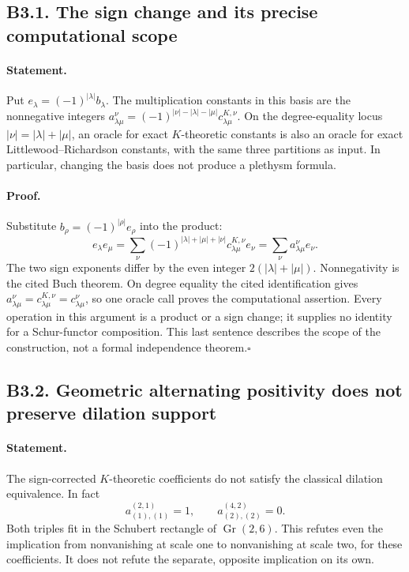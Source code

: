\subsection*{B3.1. The sign change and its precise computational scope}
\paragraph{Statement.}
Put $e_\lambda=(-1)^{|\lambda|}b_\lambda$.  The multiplication constants
in this basis are the nonnegative integers
$a_{\lambda\mu}^{\nu}=(-1)^{|\nu|-|\lambda|-|\mu|}
c^{K,\nu}_{\lambda\mu}$.  On the degree-equality locus
$|\nu|=|\lambda|+|\mu|$, an oracle for exact $K$-theoretic constants is
also an oracle for exact Littlewood--Richardson constants, with the same
three partitions as input.  In particular, changing the basis does not
produce a plethysm formula.
\paragraph{Proof.}
Substitute $b_\rho=(-1)^{|\rho|}e_\rho$ into the product:
\[
 e_\lambda e_\mu
 =\sum_\nu(-1)^{|\lambda|+|\mu|+|\nu|}
      c^{K,\nu}_{\lambda\mu}e_\nu
 =\sum_\nu a_{\lambda\mu}^{\nu}e_\nu.
\]
The two sign exponents differ by the even integer
$2(|\lambda|+|\mu|)$.  Nonnegativity is the cited Buch theorem.
On degree equality the cited identification gives
$a_{\lambda\mu}^{\nu}=c^{K,\nu}_{\lambda\mu}=c_{\lambda\mu}^{\nu}$,
so one oracle call proves the computational assertion.  Every operation
in this argument is a product or a sign change; it supplies no identity
for a Schur-functor composition.  This last sentence describes the scope
of the construction, not a formal independence theorem.\hfill$\square$

\subsection*{B3.2. Geometric alternating positivity does not preserve dilation support}
\paragraph{Statement.}
The sign-corrected $K$-theoretic coefficients do not satisfy the classical
dilation equivalence.  In fact
\[
 a_{(1),(1)}^{(2,1)}=1,
 \qquad a_{(2),(2)}^{(4,2)}=0.
\]
Both triples fit in the Schubert rectangle of $\operatorname{Gr}(2,6)$.
This refutes even the implication from nonvanishing at scale one to
nonvanishing at scale two, for these coefficients.  It does not refute
the separate, opposite implication on its own.
